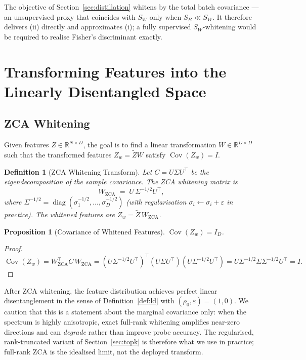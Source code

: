 \documentclass[11pt,a4paper]{article}
\newtheorem{proposition}[theorem]{Proposition}
\newtheorem{definition}[theorem]{Definition}
\newcommand{\R}{\mathbb{R}}
\newcommand{\Cov}{\operatorname{Cov}}
\newcommand{\diag}{\operatorname{diag}}
\begin{document}
The objective of Section~\ref{sec:distillation} whitens by the total batch
covariance — an unsupervised proxy that coincides with $S_W$ only when
$S_B \ll S_W$.  It therefore delivers (ii) directly and approximates (i); a
fully supervised $S_W$-whitening would be required to realise Fisher's
discriminant exactly.

\section{Transforming Features into the Linearly Disentangled Space}
\label{sec:whitening}

\subsection{ZCA Whitening}
\label{sec:zca}

Given features $Z \in \R^{N \times D}$, the goal is to find a linear
transformation $W \in \R^{D \times D}$ such that the transformed features
$Z_w = \tilde{Z} W$ satisfy $\Cov(Z_w) = I$.

\begin{definition}[ZCA Whitening Transform]
\label{def:zca}
Let $C = U \Sigma U^\top$ be the eigendecomposition of the sample covariance.
The \emph{ZCA whitening matrix} is
\begin{equation}
    W_{\mathrm{ZCA}} \;=\; U \,\Sigma^{-1/2} U^\top,
\label{eq:zca}
\end{equation}
where $\Sigma^{-1/2} = \diag(\sigma_1^{-1/2}, \ldots, \sigma_D^{-1/2})$
(with regularisation $\sigma_i \leftarrow \sigma_i + \varepsilon$ in practice).
The whitened features are $Z_w = \tilde{Z}\, W_{\mathrm{ZCA}}$.
\end{definition}

\begin{proposition}[Covariance of Whitened Features]
$\Cov(Z_w) = I_D$.
\end{proposition}
\begin{proof}
\[
    \Cov(Z_w) = W_{\mathrm{ZCA}}^\top C\, W_{\mathrm{ZCA}}
    = (U \Sigma^{-1/2} U^\top)^\top (U \Sigma U^\top) (U \Sigma^{-1/2} U^\top)
    = U \Sigma^{-1/2} \Sigma \Sigma^{-1/2} U^\top = I.
\]
\end{proof}

\noindent After ZCA whitening, the feature distribution achieves perfect linear
disentanglement in the sense of Definition~\ref{def:ld} with
$(\rho_0, \varepsilon) = (1, 0)$.  We caution that this is a statement about the
marginal covariance only: when the spectrum is highly anisotropic, exact
full-rank whitening amplifies near-zero directions and can \emph{degrade} rather
than improve probe accuracy.  The regularised, rank-truncated variant of
Section~\ref{sec:topk} is therefore what we use in practice; full-rank ZCA is the
idealised limit, not the deployed transform.
\end{document}
